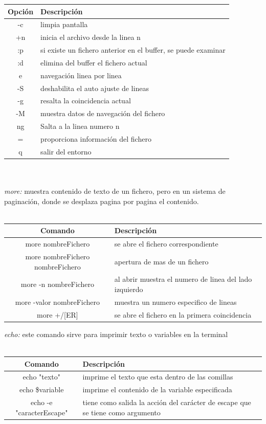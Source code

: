 \documentclass[10pt,a4paper,titlepage]{article}
\begin{document}
	\begin{tabular}{|c|p{8cm}|}
		\hline
		Opción & Descripción \\
		\hline
		-c & limpia pantalla \\
		\hline
		+n & inicia el archivo desde la linea n \\
		\hline
		:p & si existe un fichero anterior en el buffer, se puede examinar \\
		\hline
		:d & elimina del buffer el fichero actual \\
		\hline
		e & navegación linea por linea \\
		\hline
		-S & deshabilita el auto ajuste de lineas \\
		\hline
		-g & resalta la coincidencia actual \\
		\hline
		-M & muestra datos de navegación del fichero \\
		\hline
		ng & Salta a la linea numero n \\
		\hline
		= & proporciona información del fichero \\
		\hline
		q & salir del entorno \\
		\hline
	\end{tabular}
	\\
	\\
	\emph{more:} muestra contenido de texto de un fichero, pero en un sistema de paginación, donde se desplaza pagina por pagina el contenido.
	\\
	\\
	\begin{tabular}{|c|p{8cm}|}
		\hline
		Comando & Descripción \\
		\hline
		more nombreFichero & se abre el fichero correspondiente \\
		\hline
		more nombreFichero nombreFichero & apertura de mas de un fichero \\
		\hline
		more -n nombreFichero & al abrir muestra el numero de linea del lado izquierdo \\
		\hline
		more -valor nombreFichero & muestra un numero especifico de lineas \\
		\hline
		more +/[ER] & se abre el fichero en la primera coincidencia \\
		\hline
	\end{tabular}
	\emph{echo:} este comando sirve para imprimir texto o variables en la terminal
	\\
	\\
	\begin{tabular}{|c|p{8cm}|}
		\hline
		Comando & Descripción \\
		\hline
		echo "texto" & imprime el texto que esta dentro de las comillas \\
		\hline
		echo \$variable & imprime el contenido de la variable especificada \\
		\hline
		echo -e "caracterEscape" & tiene como salida la acción del carácter de escape que se tiene como argumento \\
		\hline
	\end{tabular}
\end{document}
